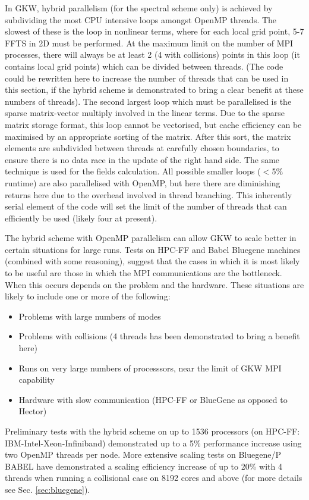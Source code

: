 In GKW, hybrid parallelism (for the spectral scheme only) is achieved by subdividing the most CPU intensive loops amongst OpenMP threads.  
The slowest of these is the loop in nonlinear terms, where for each local grid point, 5-7 FFTS in 2D must be performed. 
At the maximum limit on the number of MPI processes, 
there will always be at least 2 (4 with collisions) points in this loop (it contains  local grid points) 
which can be divided between threads.  
(The code could be rewritten here to increase the number of threads that can be used in this section, 
if the hybrid scheme is demonstrated to bring a clear benefit at these numbers of threads).  
The second largest loop which must be parallelised is the sparse matrix-vector multiply involved in the linear terms. 
Due to the sparse matrix storage format, this loop cannot be vectorised, but cache efficiency can be maximised 
by an appropriate sorting of the matrix.  After this sort, the matrix elements are subdivided between threads at carefully chosen boundaries,  
to ensure there is no data race in the update of the right hand side.  The same technique is used for the fields calculation. 
All possible smaller loops ($<$5\% runtime) are also parallelised with OpenMP, 
but here there are diminishing returns here due to the overhead involved in thread branching.  
This inherently serial element of the code will set the limit of the number of threads that can efficiently be used (likely four at present).
 
The hybrid scheme with OpenMP parallelism can allow GKW to scale better in certain situations for large runs.  
Tests on HPC-FF and Babel Bluegene machines (combined with some reasoning), suggest that the cases in which it is most likely to be useful 
are those in which the MPI communications are the bottleneck.  When this occurs depends on the problem and the hardware.  
These situations are likely to include one or more of the following:
\begin{itemize}
 \item Problems with large numbers of modes
 \item Problems with collisions (4 threads has been demonstrated to bring a benefit here)
 \item Runs on very large numbers of processsors, near the limit of GKW MPI capability
 \item Hardware with slow communication (HPC-FF or BlueGene as opposed to Hector)
\end{itemize}

Preliminary tests with the hybrid scheme on up to 1536 processors (on HPC-FF: IBM-Intel-Xeon-Infiniband) demonstrated up to a 5\% 
performance increase using two OpenMP threads per node.  More extensive scaling tests on Bluegene/P BABEL have
demonstrated a scaling efficiency increase of up to 20\% with 4 threads when running a collisional case on 8192 cores and above 
(for more details see Sec. \ref{sec:bluegene}).

